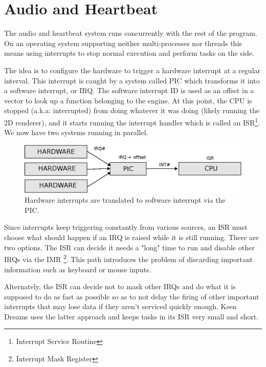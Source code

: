 \documentclass[book.tex]{subfiles}
\begin{document}
\section{Audio and Heartbeat} 
\label{audio_and_heartbeat}
The audio and heartbeat system runs concurrently with the rest of the program. On an operating system supporting neither multi-processes nor threads this means using interrupts to stop normal execution and perform tasks on the side.\\
\par
The idea is to configure the hardware to trigger a hardware interrupt at a regular interval. This interrupt is caught by a system called PIC which transforms it into a software interrupt, or IRQ. The software interrupt ID is used as an offset in a vector to look up a function belonging to the engine. At this point, the CPU is stopped (a.k.a: interrupted) from doing whatever it was doing (likely running the 2D renderer), and it starts running the interrupt handler which is called an ISR\footnote{Interrupt Service Routine}. We now have two systems running in parallel.\\
\par
\begin{figure}[H]
  \centering
  \includegraphics[width=\textwidth]{imgs/drawings/irqs/explanationsvg.eps}
  \caption{Hardware interrupts are translated to software interrupt via the PIC.}
\end{figure}
\par
 Since interrupts keep triggering constantly from various sources, an ISR must choose what should happen if an IRQ is raised while it is still running. There are two options.  The ISR can decide it needs a "long" time to run and disable other IRQs via the IMR \footnote{Interrupt Mask Register}. This path introduces the problem of discarding important information such as keyboard or mouse inputs.\\
 \par
 Alternately, the ISR can decide not to mask other IRQs and do what it is supposed to do as fast as possible so as to not delay the firing of other important interrupts that may lose data if they aren't serviced quickly enough. Keen Dreams uses the latter approach and keeps tasks in its ISR very small and short. 
\end{document}
